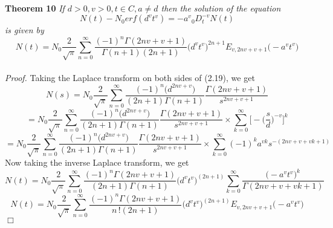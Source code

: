 \documentclass[leqno]{article}
\begin{document}
\noindent\\
{\bf Theorem 10}
{\it 
If $d > 0, v > 0, t \in C, a \neq d $ then the solution of the equation
\begin{equation}
    N(t) - {N_0}erf({d^v}{t^v}) = {-a^v}{_0D_t^{-v}}N(t)
\end{equation}
is given by
\begin{equation}
    N(t) = N_0
    {\frac{2}{\sqrt{\pi}}}
    \sum_{n = 0}^{\infty}
    \frac{(-1)^n\Gamma{(2nv+v+1)}}{\Gamma{(n+1)}(2n+1)}
    \big({d^v}{t^v}\big)^{2n+1}
    E_{v, 2nv+v+1}
    \big(-{a^v}{t^v}\big)
\end{equation}
}
\vspace{0.05in}\\
%
\noindent
{\it Proof.}
Taking the Laplace transform on both sides of (2.19), we get
\begin{equation*}
    N(s)=N_0
    {\frac{2}{\sqrt{\pi}}}
    \sum_{n = 0}^{\infty}
    \frac{(-1)^n{\big(d^{2nv+v}\big)}}{(2n+1)\Gamma{(n+1)}}
    \frac{\Gamma{(2nv+v+1)}}{s^{2nv+v+1}}
\end{equation*}
\begin{equation*}
    =N_0
    {\frac{2}{\sqrt{\pi}}}
    \sum_{n = 0}^{\infty}
    \frac{(-1)^n{\big(d^{2nv+v}\big)}}{(2n+1)\Gamma{(n+1)}}
    \frac{\Gamma{(2nv+v+1)}}{s^{2nv+v+1}}
    \times
    \sum_{k=0}^{\infty}
    \bigg[
        -{\bigg(\frac{s}{d}\bigg)^{-v}}
    \bigg]^k
\end{equation*}
\begin{equation*}
    =N_0
    {\frac{2}{\sqrt{\pi}}}
    \sum_{n = 0}^{\infty}
    \frac{(-1)^n{\big(d^{2nv+v}\big)}}{(2n+1)\Gamma{(n+1)}}
    \frac{\Gamma{(2nv+v+1)}}{s^{2nv+v+1}}
    \times
    \sum_{k=0}^{\infty}
    (-1)^k{a^{vk}}{s^{-(2nv+v+vk+1)}}
\end{equation*}
Now taking the inverse Laplace transform, we get
\begin{equation*}
    N(t) = N_0
    {\frac{2}{\sqrt{\pi}}}
    \sum_{n = 0}^{\infty}
    \frac{(-1)^n\Gamma{(2nv+v+1)}}{(2n+1)\Gamma{(n+1)}}
    \big({d^v}{t^v} \big) ^{(2n+1)}
    \sum_{k=0}^{\infty}
    \frac{\big(-{a^v}{t^v}\big)^k}{\Gamma{(2nv+v+vk+1)}}
\end{equation*}
\begin{equation*}
    N(t) = N_0
    {\frac{2}{\sqrt{\pi}}}
    \sum_{n = 0}^{\infty}
    \frac{(-1)^n\Gamma{(2nv+v+1)}}{{n\,!}(2n+1)}
    \big({d^v}{t^v}\big)^{(2n+1)}
    E_{v, 2nv+v+1}
    \big(-{a^v}{t^v}\big)
\end{equation*} 
\hfill$\Box$
\medskip
\\
\end{document}
